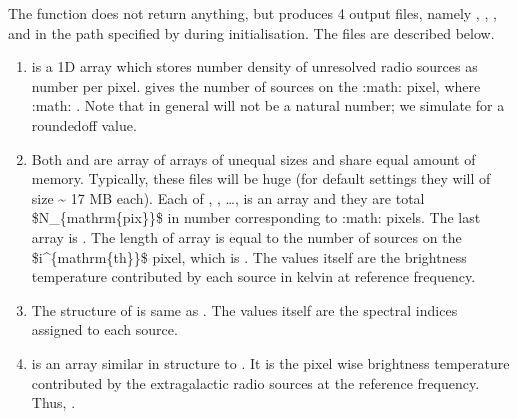 \documentclass[letterpaper,10pt,english]{sphinxmanual}
\begin{document}
\sphinxAtStartPar
The function does not return anything, but produces 4 output files,
namely , , , and
 in the path specified by  during initialisation.
The files are described below.
\begin{enumerate}
%
\item {} 
\sphinxAtStartPar
{} is a 1D array which stores number density of
unresolved radio sources as number per pixel.  gives the
number of sources on the :math:  pixel, where
:math: . Note that in general 
will not be a natural number; we simulate for a rounded\sphinxhyphen{}off value.

\item {} 
\sphinxAtStartPar
Both  and  are array of arrays of
unequal sizes and share equal amount of memory. Typically, these
files will be huge (for default settings they will of size \textasciitilde{} 17 MB
each). Each of , , …,
is an array and they are total \$N\_\{mathrm\{pix\}\}\$ in number
corresponding to :math:  pixels. The last array is
. The length of array
 is equal to the number of sources on the
\$i\textasciicircum{}\{mathrm\{th\}\}\$ pixel, which is . The values
itself are the brightness temperature contributed by each source in
kelvin at reference frequency.

\item {} 
\sphinxAtStartPar
The structure of  is same as . The values
itself are the spectral indices assigned to each source.

\item {} 
\sphinxAtStartPar
{} is an array similar in structure to . It is
the pixel wise brightness temperature contributed by the
extragalactic radio sources at the reference frequency. Thus,
.

\end{enumerate}
\end{document}
